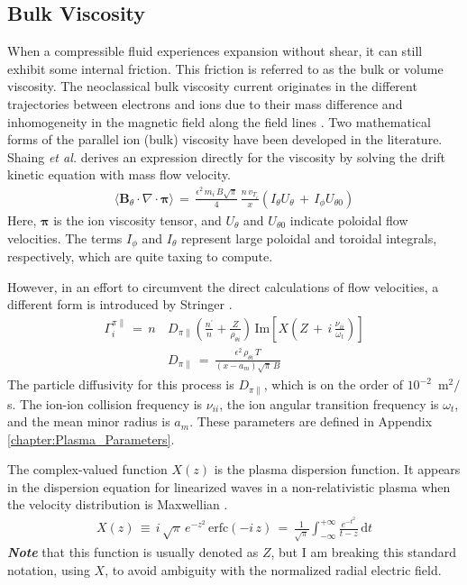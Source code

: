 \subsection{Bulk Viscosity}\label{ssec:bulk_viscosity}
When a compressible fluid experiences expansion without shear, it can still exhibit some internal friction.
This friction is referred to as the bulk or volume viscosity.
The neoclassical bulk viscosity current originates in the different trajectories between electrons and ions due to their mass difference and inhomogeneity in the magnetic field along the field lines \cite{kobayashi_model_2017}.
Two mathematical forms of the parallel ion (bulk) viscosity have been developed in the literature.
Shaing \emph{et al.} \cite{shaing_bifurcation_1990} derives an expression directly for the viscosity by solving the drift kinetic equation with mass flow velocity.
\begin{align}%
	\langle \mathbf{B}_\theta \cdot \nabla \cdot \boldsymbol{\pi} \rangle \,=\,
		\frac{\epsilon^2 \, m_i \, B \sqrt{\pi}}{4} \, \frac{n\,v_{T_i}}{x}
		\left(I_\theta U_\theta \,+\, I_\phi U_{\theta 0}\right)
		\label{eq:shaing_bulk}
\end{align}
Here, $\boldsymbol{\pi}$ is the ion viscosity tensor, and $U_\theta$ and $U_{\theta 0}$ indicate poloidal flow velocities.
The terms $I_\phi$ and $I_\theta$ represent large poloidal and toroidal integrals, respectively, which are quite taxing to compute.

However, in an effort to circumvent the direct calculations of flow velocities, a different form is introduced by Stringer \cite{stringer_explanation_1993}.
\begin{align} %
	\Gamma_i^{\pi\parallel} \,=\, n \, &D_{\pi\parallel}
		\left(\frac{n^\prime}{n} + \frac{Z}{\rho_{\theta i}}\right) \,
		\text{Im}\left[X\left(Z \,+\, i\,\frac{\nu_{ii}}{\omega_t}\right)\right]
		\label{eq:stringer_Gamma_bulk} \\
	&D_{\pi\parallel} \,=\, \frac{\epsilon^2\,\rho_{\theta i}\,T}
		{(x - a_m)\sqrt{\pi}\,B} \label{eq:stringer_D_bulk}
\end{align}
The particle diffusivity for this process is $D_{\pi\parallel}$, which is on the order of $10^{-2}$~m$^2 / $s.
The ion-ion collision frequency is $\nu_{ii}$, the ion angular transition frequency is $\omega_t$, and the mean minor radius is $a_m$.
These parameters are defined in Appendix \ref{chapter:Plasma_Parameters}.

The complex-valued function $X(z)$ is the plasma dispersion function.
It appears in the dispersion equation for linearized waves in a non-relativistic plasma when the velocity distribution is Maxwellian \cite{fried_plasma_2015}.
\begin{align} %
	X(z) \,\equiv\, i\,\sqrt{\pi} \, e^{-z^2} \, \text{erfc}(-i\,z) \,=\,
		\frac{1}{\sqrt{\pi}} \int_{-\infty}^{+\infty} \frac{e^{-t^2}}{t - z}
		\, \text{d}t \label{eq:plasma_disp}
\end{align}
\emph{\textbf{Note}} that this function is usually denoted as $Z$, but I am breaking this standard notation, using $X$, to avoid ambiguity with the normalized radial electric field.

